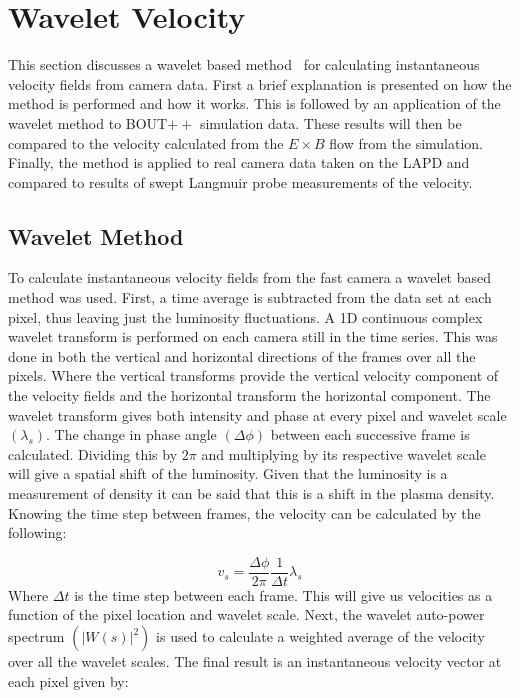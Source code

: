 \documentclass[%
 reprint,
 amsmath,amssymb,
 aps,
]{revtex4-1}
\begin{document}
%
%
%
%
\section{\label{sec:level1}Wavelet Velocity}

This section discusses a wavelet based method~\cite{chaston10} for calculating instantaneous velocity fields from camera data. First a brief explanation is presented on how the method is performed and how it works. This is followed by an application of the wavelet method to BOUT$++$ simulation data. These results will then be compared to the velocity calculated from the $E \times B$ flow from the simulation. Finally, the method is applied to real camera data taken on the LAPD and compared to results of swept Langmuir probe measurements of the velocity.

%
%
%
%
\subsection{\label{sec:level2}Wavelet Method}

To calculate instantaneous velocity fields from the fast camera a wavelet based method was used. First, a time average is subtracted from the data set at each pixel, thus leaving just the luminosity fluctuations. A 1D continuous complex wavelet transform is performed on each camera still in the time series. This was done in both the vertical and horizontal directions of the frames over all the pixels. Where the vertical transforms provide the vertical velocity component of the velocity fields and the horizontal transform the horizontal component. The wavelet transform gives both intensity and phase at every pixel and wavelet scale $(\lambda_s)$. The change in phase angle $(\Delta\phi)$ between each successive frame is calculated. Dividing this by $2\pi$ and multiplying by its respective wavelet scale will give a spatial shift of the luminosity. Given that the luminosity is a measurement of density it can be said that this is a shift in the plasma density. Knowing the time step between frames, the velocity can be calculated by the following:

\begin{equation} v_s=\frac{\Delta\phi}{2\pi}\frac{1}{\Delta t}\lambda_s
\label{eq:two}
\end{equation}
Where $\Delta t$ is the time step between each frame. This will give us velocities as a function of the pixel location and wavelet scale. Next, the wavelet auto-power spectrum $(\vert W(s) \vert^2)$ is used to calculate a weighted average of the velocity over all the wavelet scales. The final result is an instantaneous velocity vector at each pixel given by:
\end{document}
